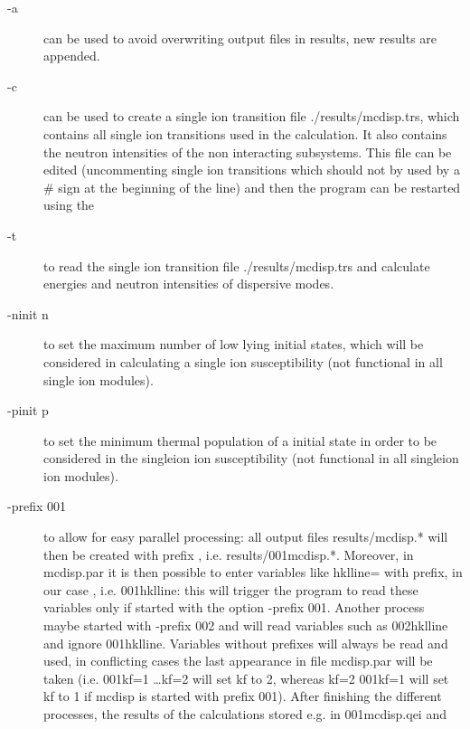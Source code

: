 \begin{description}
\begin{description}
				\item [{\prg -a}] can be used to avoid overwriting output files in results, new results
				are appended.
								
				\item [{\prg -c}]  can be used to create  a single ion
				transition file {\prg ./results/mcdisp.trs}, which contains
				all single ion transitions used in the calculation. It also contains the 
                                    neutron intensities of the non interacting subsystems. This file can
				be edited (uncommenting single ion transitions which should not
				by used by a \# sign at the beginning of the line)
				and then the program can be restarted using the 
				\item  [ {\prg -t}] to
				read the single ion transition file {\prg ./results/mcdisp.trs} and
				calculate energies and neutron intensities of dispersive modes.
				\item [ {\prg -ninit n}] to set the maximum number of low lying
                                 initial states, which will be considered in calculating a single ion susceptibility (not functional
                                 in all single ion modules).
 \item [{\prg -pinit p}] to set the minimum thermal population of a 
                                 initial state in order to be considered in the singleion ion susceptibility (not functional in
                                 all singleion ion modules).
 \item [{\prg -prefix 001}] to allow for easy parallel processing: all output files {\prg results/mcdisp.*}
                  will then be created with prefix {}, i.e. {\prg results/001mcdisp.*}.
                  Moreover,  in {\prg mcdisp.par} it is then possible to enter
                  variables like {\prg hklline=}  with prefix, in our case {}, i.e. {\prg 001hklline}: this will trigger
                  the program to read these variables only if started with the option {\prg -prefix 001}. Another process
                  maybe started with {\prg -prefix 002} and will read variables such as {\prg 002hklline} and ignore {\prg 001hklline}.
                  Variables without prefixes will always be read and used, in conflicting cases the last appearance in file
                  mcdisp.par will be taken (i.e. 001kf=1 \dots kf=2 will set kf to 2, whereas kf=2 001kf=1 will set kf to 1 if mcdisp is
                  started with prefix 001).
                  After finishing the different processes, the results of the calculations stored e.g. in {\prg 001mcdisp.qei} and

\end{description}
\end{description}
